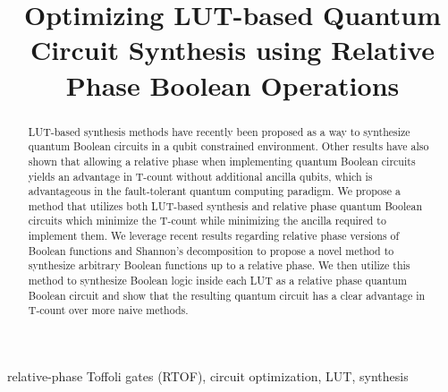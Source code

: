 \documentclass[conference]{IEEEtran}
\renewcommand{\baselinestretch}{1.08}
\begin{document}
\title{Optimizing LUT-based Quantum Circuit Synthesis using Relative Phase Boolean Operations}
\author{
  \and
  \and
}

\maketitle

\begin{abstract}
  LUT-based synthesis methods have recently been proposed as a way to
  synthesize quantum Boolean circuits in a qubit constrained
  environment. Other results have also shown that allowing a relative
  phase when implementing quantum Boolean circuits yields an advantage
  in T-count without additional ancilla qubits, which is advantageous
  in the fault-tolerant quantum computing paradigm. We propose a
  method that utilizes both LUT-based synthesis and relative phase
  quantum Boolean circuits which minimize the T-count while minimizing
  the ancilla required to implement them. We leverage recent results
  regarding relative phase versions of Boolean functions and Shannon's
  decomposition to propose a novel method to synthesize
  arbitrary Boolean functions up to a relative phase. We then utilize 
  this method to synthesize Boolean logic inside each LUT as a 
  relative phase quantum Boolean circuit and show that the resulting
  quantum circuit has a clear advantage in T-count over 
  more naive methods.  
\end{abstract}

\begin{IEEEkeywords}
relative-phase Toffoli gates (RTOF), circuit optimization, LUT, synthesis
\end{IEEEkeywords}









\vspace{-0.3cm}


\end{document}
